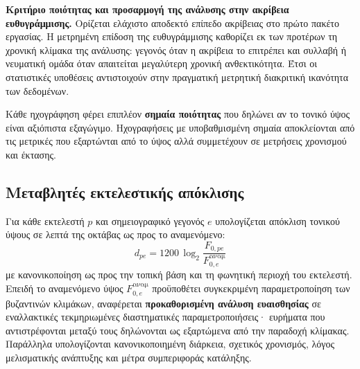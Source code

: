 \documentclass[11pt,a4paper]{article}
\begin{document}
\textbf{Κριτήριο ποιότητας και προσαρμογή της ανάλυσης στην ακρίβεια ευθυγράμμισης.} Ορίζεται ελάχιστο αποδεκτό επίπεδο ακρίβειας στο πρώτο πακέτο εργασίας. Η μετρημένη επίδοση της ευθυγράμμισης καθορίζει εκ των προτέρων τη χρονική κλίμακα της ανάλυσης: γεγονός όταν η ακρίβεια το επιτρέπει και συλλαβή ή νευματική ομάδα όταν απαιτείται μεγαλύτερη χρονική ανθεκτικότητα. Έτσι οι στατιστικές υποθέσεις αντιστοιχούν στην πραγματική μετρητική διακριτική ικανότητα των δεδομένων.

Κάθε ηχογράφηση φέρει επιπλέον \textbf{σημαία ποιότητας} που δηλώνει αν το τονικό ύψος είναι αξιόπιστα εξαγώγιμο. Ηχογραφήσεις με υποβαθμισμένη σημαία αποκλείονται από τις μετρικές που εξαρτώνται από το ύψος αλλά συμμετέχουν σε μετρήσεις χρονισμού και έκτασης.

\subsection{Μεταβλητές εκτελεστικής απόκλισης}\label{app:impl-vars}

Για κάθε εκτελεστή \(p\) και σημειογραφικό γεγονός \(e\) υπολογίζεται απόκλιση τονικού ύψους σε λεπτά της οκτάβας ως προς το αναμενόμενο:
\[
d_{pe}=1200\,\log_2\!\frac{F_{0,pe}}{F^{\text{αναμ}}_{0,e}}
\]
με κανονικοποίηση ως προς την τοπική βάση και τη φωνητική περιοχή του εκτελεστή. Επειδή το αναμενόμενο ύψος \(F^{\text{αναμ}}_{0,e}\) προϋποθέτει συγκεκριμένη παραμετροποίηση των βυζαντινών κλιμάκων, αναφέρεται \textbf{προκαθορισμένη ανάλυση ευαισθησίας} σε εναλλακτικές τεκμηριωμένες διαστηματικές παραμετροποιήσεις· ευρήματα που αντιστρέφονται μεταξύ τους δηλώνονται ως εξαρτώμενα από την παραδοχή κλίμακας. Παράλληλα υπολογίζονται κανονικοποιημένη διάρκεια, σχετικός χρονισμός, λόγος μελισματικής ανάπτυξης και μέτρα συμπεριφοράς κατάληξης.
\end{document}
